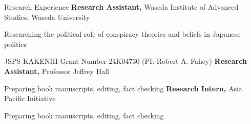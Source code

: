 \begin{rubric}{Research Experience}
\entry*[2023/09 -- 2025/03]%
	\textbf{Research Assistant,} Waseda Institute of Advanced Studies, Waseda University
        \par \small Researching the political role of conspiracy theories and beliefs in Japanese politics
        \par \small JSPS KAKENHI Grant Number 24K04730 (PI: Robert A. Fahey)
\entry*[2020/09 -- 2020/10]%
	\textbf{Research Assistant,} Professor Jeffrey Hall
        \par \small Preparing book manuscripts, editing, fact checking 
 \entry*[2020/04 -- 2020/06]%
	\textbf{Research Intern,} Asia Pacific Initiative
        \par \small  Preparing book manuscripts, editing, fact checking
 \end{rubric}
